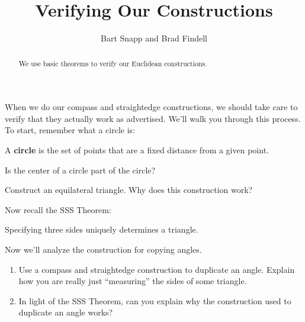 \documentclass[nooutcomes]{ximera}
\title{Verifying Our Constructions}
\author{Bart Snapp and Brad Findell}
\begin{document}
\begin{abstract}
  We use basic theorems to verify our Euclidean constructions.
\end{abstract}
\maketitle

\begin{teachingnote}
\end{teachingnote}


When we do our compass and straightedge constructions, we should take
care to verify that they actually work as advertised. We'll walk you
through this process. To start, remember what a circle is:

\begin{definition} 
A \textbf{circle} is the set of points that are a fixed distance from
a given point.
\end{definition}

\begin{problem} Is the center of a circle part of the circle?
\end{problem}

\begin{problem} 
Construct an equilateral triangle.  Why does this construction work?
\end{problem}




Now recall the SSS Theorem:

\begin{theorem}[SSS] 
Specifying three sides uniquely determines a triangle.
\end{theorem}



\begin{problem} Now we'll analyze the construction for copying angles. 
\begin{enumerate}
\item Use a compass and straightedge construction to duplicate an
  angle. Explain how you are really just ``measuring'' the sides of
  some triangle.
\item In light of the SSS Theorem, can you explain why the
  construction used to duplicate an angle works?
\end{enumerate}
\end{problem}
\end{document}

